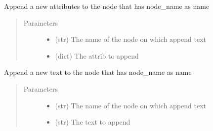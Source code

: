 \documentclass[a4paper,10pt,english]{sphinxmanual}
\begin{document}
\begin{fulllineitems}
\begin{fulllineitems}
\end{fulllineitems}


\begin{fulllineitems}
\label{\detokenize{apidoc_src/src:src.xmlManager.XmlLogFile.append_node_attrib}}
Append a new attributes to the node that has node\_name as name
\begin{quote}\begin{description}
\item[{Parameters}] \leavevmode\begin{itemize}
\item {} 
 \textendash{} (str) The name of the node on which append text

\item {} 
 \textendash{} (dict) The attrib to append

\end{itemize}

\end{description}\end{quote}

\end{fulllineitems}


\begin{fulllineitems}
\label{\detokenize{apidoc_src/src:src.xmlManager.XmlLogFile.append_node_text}}
Append a new text to the node that has node\_name as name
\begin{quote}\begin{description}
\item[{Parameters}] \leavevmode\begin{itemize}
\item {} 
 \textendash{} (str) The name of the node on which append text

\item {} 
 \textendash{} (str) The text to append

\end{itemize}


\end{description}
\end{quote}
\end{fulllineitems}
\end{fulllineitems}
\end{document}

